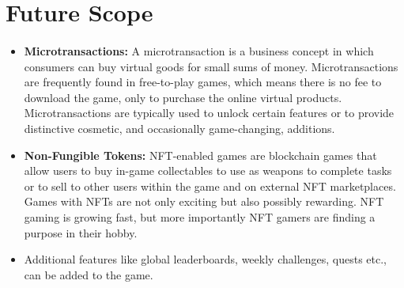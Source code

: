 \documentclass[oneside,12pt]{Classes/VTU}
\begin{document}
		\paragraph{}
		
		\paragraph{}
		
		\section{Future Scope}
		\paragraph{}
		
			\begin{itemize}
				\item \textbf{Microtransactions: }A microtransaction is a business concept in which consumers can buy virtual goods for small sums of money. Microtransactions are frequently found in free-to-play games, which means there is no fee to download the game, only to purchase the online virtual products. Microtransactions are typically used to unlock certain features or to provide distinctive cosmetic, and occasionally game-changing, additions. 
				
				\item \textbf{Non-Fungible Tokens: } NFT-enabled games are blockchain games that allow users to buy in-game collectables to use as weapons to complete tasks or to sell to other users within the game and on external NFT marketplaces. Games with NFTs are not only exciting but also possibly rewarding. NFT gaming is growing fast, but more importantly NFT gamers are finding a purpose in their hobby. 
				
				\item Additional features like global leaderboards, weekly challenges, quests etc., can be added to the game.
			\end{itemize}
	
\end{document}
